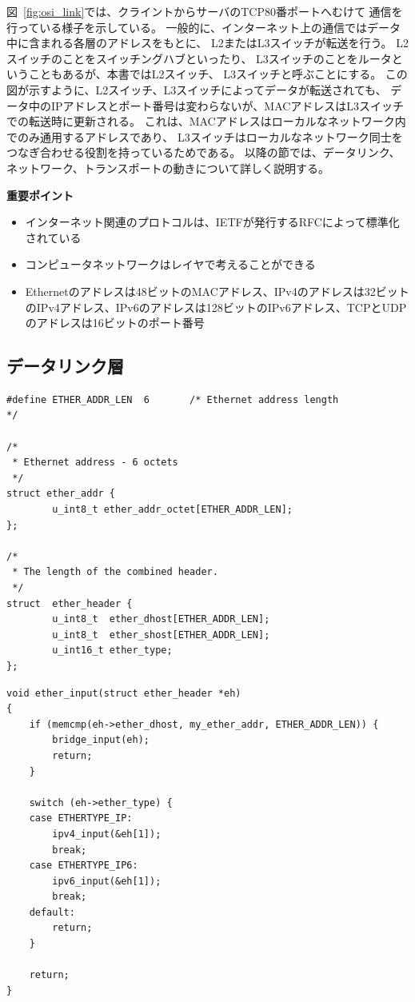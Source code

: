 図~\ref{fig:osi_link}では、クライントからサーバのTCP80番ポートへむけて
通信を行っている様子を示している。
一般的に、インターネット上の通信ではデータ中に含まれる各層のアドレスをもとに、
L2またはL3スイッチが転送を行う。
L2スイッチのことをスイッチングハブといったり、
L3スイッチのことをルータということもあるが、本書ではL2スイッチ、
L3スイッチと呼ぶことにする。
この図が示すように、L2スイッチ、L3スイッチによってデータが転送されても、
データ中のIPアドレスとポート番号は変わらないが、MACアドレスはL3スイッチでの転送時に更新される。
これは、MACアドレスはローカルなネットワーク内でのみ通用するアドレスであり、
L3スイッチはローカルなネットワーク同士をつなぎ合わせる役割を持っているためである。
以降の節では、データリンク、ネットワーク、トランスポートの動きについて詳しく説明する。

\begin{itembox}[l]{\bf 重要ポイント}
    \begin{itemize}
        \item インターネット関連のプロトコルは、IETFが発行するRFCによって標準化されている
        \item コンピュータネットワークはレイヤで考えることができる
        \item Ethernetのアドレスは48ビットのMACアドレス、IPv4のアドレスは32ビットのIPv4アドレス、IPv6のアドレスは128ビットのIPv6アドレス、TCPとUDPのアドレスは16ビットのポート番号
    \end{itemize}
\end{itembox}

\subsection{データリンク層} \label{sec:datalink}

\begin{lstlisting}[caption=Ethernetプロトコルヘッダ定義 (/usr/include/netinet/if\_ether.h),label=src:if_ether.h]
#define ETHER_ADDR_LEN  6       /* Ethernet address length              */

/*
 * Ethernet address - 6 octets
 */
struct ether_addr {
        u_int8_t ether_addr_octet[ETHER_ADDR_LEN];
};

/*
 * The length of the combined header.
 */
struct  ether_header {
        u_int8_t  ether_dhost[ETHER_ADDR_LEN];
        u_int8_t  ether_shost[ETHER_ADDR_LEN];
        u_int16_t ether_type;
};
\end{lstlisting}


\begin{lstlisting}[caption=Ethernet入力 (/usr/include/netinet/if\_ether.h),label=src:if_ether]
void ether_input(struct ether_header *eh)
{
    if (memcmp(eh->ether_dhost, my_ether_addr, ETHER_ADDR_LEN)) {
        bridge_input(eh);
        return;
    }

    switch (eh->ether_type) {
    case ETHERTYPE_IP:
        ipv4_input(&eh[1]);
        break;
    case ETHERTYPE_IP6:
        ipv6_input(&eh[1]);
        break;
    default:
        return;
    }

    return;
}
\end{lstlisting}


